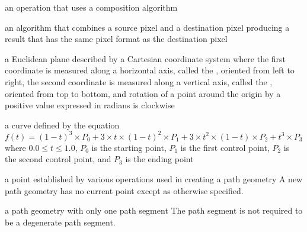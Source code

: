 %
%
an operation that uses a composition algorithm

an algorithm that combines a source pixel and a destination pixel producing a result that has the same pixel format as the destination pixel

a Euclidean plane described by a Cartesian coordinate system where the first coordinate is measured along a horizontal axis, called the \xaxis, oriented from left to right, the second coordinate is measured along a vertical axis, called the \yaxis, oriented from top to bottom, and rotation of a point around the origin by a positive value expressed in radians is clockwise

a curve defined by the 
equation $f(t) = (1 - t)^{3} \times P_{0} + 3 \times t \times (1 - t)^{2} 
\times P_{1} + 3 \times t^{2} \times (1 - t) \times P_{2} + t^{3} \times P_{3}$ 
where $0.0 \le t \le 1.0$, $P_{0}$ is the starting point, $P_{1}$ is the first 
control point, $P_{2}$ is the second control point, and $P_{3}$ is the 
ending point

a point established by various operations used in creating a path geometry
\enternote
A new path geometry has no current point except as otherwise specified.
\exitnote

a path geometry with only one path segment
\enternote
The path segment is not required to be a degenerate path segment.
\exitnote

